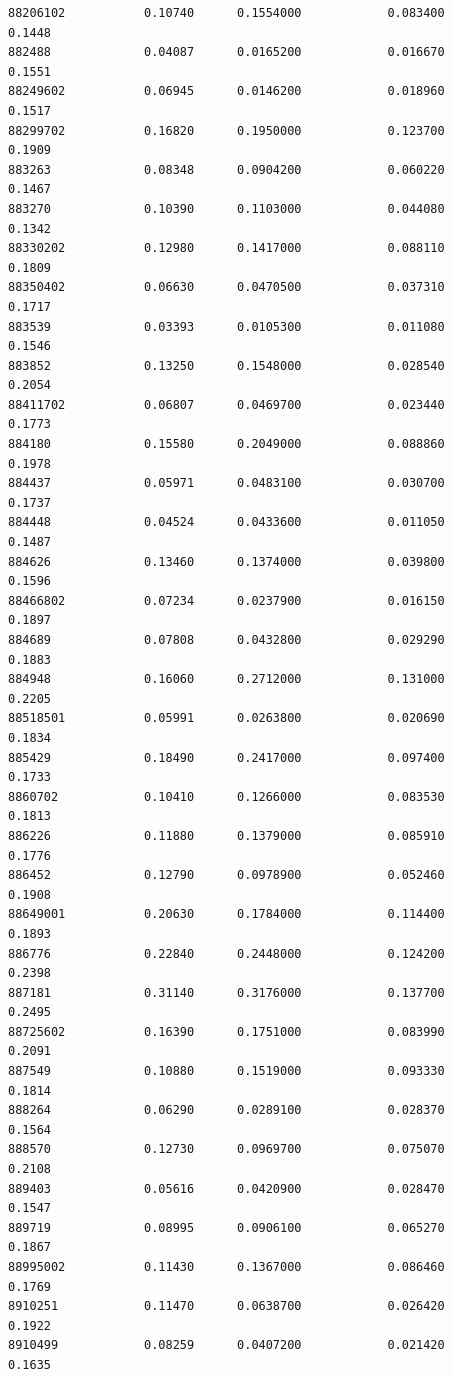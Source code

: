 \documentclass[
  letterpaper,
  DIV=11,
  numbers=noendperiod]{scrartcl}
\begin{document}
\begin{verbatim}
88206102           0.10740      0.1554000            0.083400        0.1448
882488             0.04087      0.0165200            0.016670        0.1551
88249602           0.06945      0.0146200            0.018960        0.1517
88299702           0.16820      0.1950000            0.123700        0.1909
883263             0.08348      0.0904200            0.060220        0.1467
883270             0.10390      0.1103000            0.044080        0.1342
88330202           0.12980      0.1417000            0.088110        0.1809
88350402           0.06630      0.0470500            0.037310        0.1717
883539             0.03393      0.0105300            0.011080        0.1546
883852             0.13250      0.1548000            0.028540        0.2054
88411702           0.06807      0.0469700            0.023440        0.1773
884180             0.15580      0.2049000            0.088860        0.1978
884437             0.05971      0.0483100            0.030700        0.1737
884448             0.04524      0.0433600            0.011050        0.1487
884626             0.13460      0.1374000            0.039800        0.1596
88466802           0.07234      0.0237900            0.016150        0.1897
884689             0.07808      0.0432800            0.029290        0.1883
884948             0.16060      0.2712000            0.131000        0.2205
88518501           0.05991      0.0263800            0.020690        0.1834
885429             0.18490      0.2417000            0.097400        0.1733
8860702            0.10410      0.1266000            0.083530        0.1813
886226             0.11880      0.1379000            0.085910        0.1776
886452             0.12790      0.0978900            0.052460        0.1908
88649001           0.20630      0.1784000            0.114400        0.1893
886776             0.22840      0.2448000            0.124200        0.2398
887181             0.31140      0.3176000            0.137700        0.2495
88725602           0.16390      0.1751000            0.083990        0.2091
887549             0.10880      0.1519000            0.093330        0.1814
888264             0.06290      0.0289100            0.028370        0.1564
888570             0.12730      0.0969700            0.075070        0.2108
889403             0.05616      0.0420900            0.028470        0.1547
889719             0.08995      0.0906100            0.065270        0.1867
88995002           0.11430      0.1367000            0.086460        0.1769
8910251            0.11470      0.0638700            0.026420        0.1922
8910499            0.08259      0.0407200            0.021420        0.1635

\end{verbatim}
\end{document}
